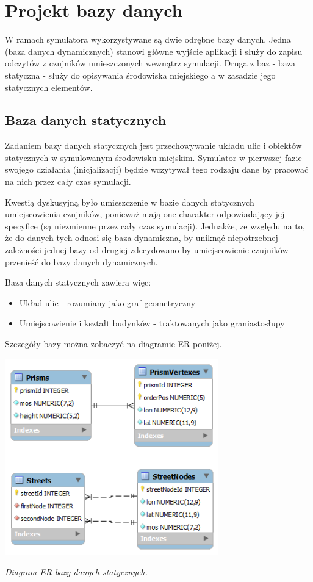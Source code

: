 {\section[Projekt bazy danych][Projekt bazy danych]{Projekt bazy danych}
\par{
W ramach symulatora wykorzystywane są dwie odrębne bazy danych. Jedna (baza danych dynamicznych) stanowi główne wyjście aplikacji i służy do zapisu odczytów z czujników umieszczonych wewnątrz symulacji. Druga z baz - baza statyczna - służy do opisywania środowiska miejskiego a w zasadzie jego statycznych elementów.
}

\subsection{Baza danych statycznych}
\par{
Zadaniem bazy danych statycznych jest przechowywanie układu ulic i obiektów statycznych w symulowanym środowisku miejskim. Symulator w pierwszej fazie swojego działania (inicjalizacji) będzie wczytywał tego rodzaju dane by pracować na nich przez cały czas symulacji.
}
\par{
Kwestią dyskusyjną było umieszczenie w bazie danych statycznych umiejscowienia czujników, ponieważ mają one charakter odpowiadający jej specyfice (są niezmienne przez cały czas symulacji). Jednakże, ze względu na to, że do danych tych odnosi się baza dynamiczna, by uniknąć niepotrzebnej zależności jednej bazy od drugiej zdecydowano by umiejscowienie czujników przenieść do bazy danych dynamicznych.
}
\par{
Baza danych statycznych zawiera więc:
\begin{itemize}
\item Układ ulic - rozumiany jako graf geometryczny
\item Umiejscowienie i kształt budynków - traktowanych jako graniastosłupy
\end{itemize}
Szczegóły bazy można zobaczyć na diagramie ER poniżej.
}

\par{
\begin{center}
\includegraphics[width=25em]{img/static_db}
\end{center}
}
\par{
\begin{center}
\textit{Diagram ER bazy danych statycznych.}
\end{center}
}

}

